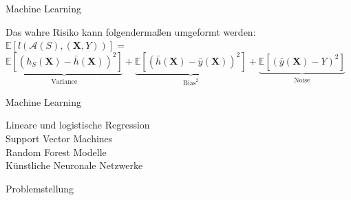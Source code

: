 \documentclass[17pt, fleqn]{beamer}
\begin{document}
\begin{frame}{Machine Learning}
    
    
    Das wahre Risiko kann folgendermaßen umgeformt werden: \\[0.5cm]
    \small{
    $ \mathbb{E}[l(\mathcal{A}(S), (\mathbf{X}, Y)) ] = $ \\ [0.5cm]
    }
    \footnotesize{
    $ \underbrace{\mathbb{E}[(h_S(\mathbf{X})- \bar{h}(\mathbf{X}))^2]}_{\text{Variance}}+\underbrace{\mathbb{E}[(\bar{h}(\mathbf{X})-\bar{y}(\mathbf{X}))^2]}_{\text{Bias}^2} + \underbrace{\mathbb{E}[(\bar{y}(\mathbf{X})-Y)^2]}_{\text{Noise}} $
    }
    
\end{frame}

\begin{frame}{Machine Learning}
    
    Lineare und logistische Regression \\ [1cm]
    \pause
    Support Vector Machines \\[1cm]
    \pause
    Random Forest Modelle \\[1cm]
    \pause
    Künstliche Neuronale Netzwerke 
    
\end{frame}


\begin{frame}{Problemstellung}
    \begin{scriptsize}
	\end{scriptsize}
    
\end{frame}
\end{document}
